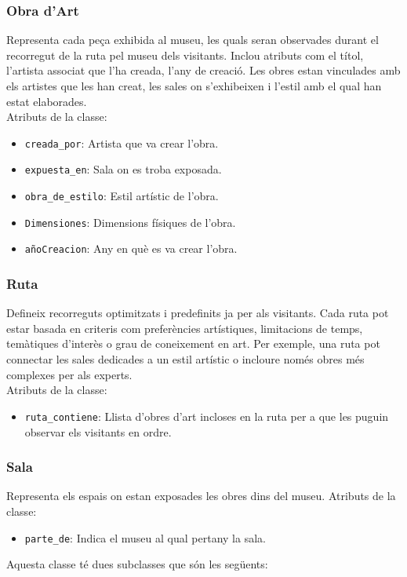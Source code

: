 \documentclass[a4paper]{article}
\begin{document}
	\subsubsection*{Obra d'Art}
	Representa cada peça exhibida al museu, les quals seran observades durant el recorregut de la ruta pel museu dels visitants. Inclou atributs com el títol, l'artista associat que l'ha creada, l'any de creació. Les obres estan vinculades amb els artistes que les han creat, les sales on s'exhibeixen i l'estil amb el qual han estat elaborades.\\
	Atributs de la classe:
	\begin{itemize}
		\item \texttt{creada\_por}: Artista que va crear l’obra.
		\item \texttt{expuesta\_en}: Sala on es troba exposada.
		\item \texttt{obra\_de\_estilo}: Estil artístic de l’obra.
		\item \texttt{Dimensiones}: Dimensions físiques de l’obra.
		\item \texttt{añoCreacion}: Any en què es va crear l’obra.
	\end{itemize}
		
	\subsubsection*{Ruta}
	Defineix recorreguts optimitzats i predefinits ja per als visitants. Cada ruta pot estar basada en criteris com preferències artístiques, limitacions de temps, temàtiques d'interès o grau de coneixement en art. Per exemple, una ruta pot connectar les sales dedicades a un estil artístic o incloure només obres més complexes per als experts.\\
	Atributs de la classe:
	\begin{itemize}
		\item \texttt{ruta\_contiene}: Llista d'obres d'art incloses en la ruta per a que les puguin observar els visitants en ordre.
	\end{itemize}
	
	\subsubsection*{Sala}
	Representa els espais on estan exposades les obres dins del museu.
	Atributs de la classe:
	\begin{itemize}
		\item \texttt{parte\_de}: Indica el museu al qual pertany la sala.
	\end{itemize}
	 Aquesta classe té dues subclasses que són les següents:
	
\end{document}
